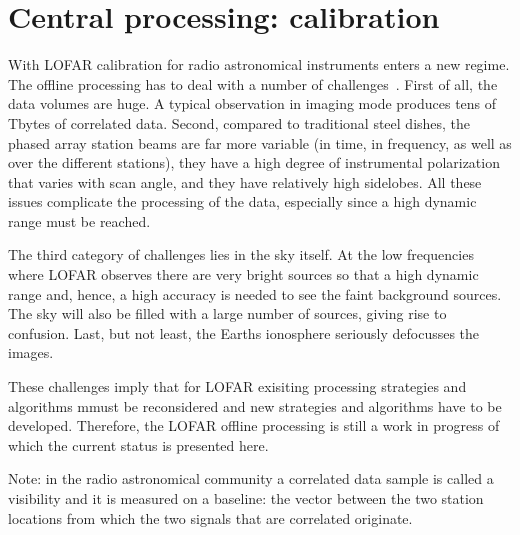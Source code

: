 \documentclass[journal]{IEEEtran}
\begin{document}

\section{Central processing: calibration}

With LOFAR calibration for radio astronomical instruments enters a new regime. The offline processing has to deal with a number of challenges~\cite{Noordam:04,Noordam:06,Nijboer:07}. First of all, the data volumes are huge. A typical observation in imaging mode produces tens of Tbytes of correlated data. Second, compared to traditional steel dishes, the phased array station beams are far more variable (in time, in frequency, as well as over the different stations), they have a high degree of instrumental polarization that varies with scan angle, and they have relatively high sidelobes. All these issues complicate the processing of the data, especially since a high dynamic range must be reached. 

The third category of challenges lies in the sky itself. At the low frequencies where LOFAR observes there are very bright sources so that a high dynamic range and, hence, a high accuracy is needed to see the faint background sources. The sky will also be filled with a large number of sources, giving rise to confusion. Last, but not least, the Earths ionosphere seriously defocusses the images.

These challenges imply that for LOFAR exisiting processing strategies and algorithms mmust be reconsidered and new strategies and algorithms have to be developed. Therefore, the LOFAR offline processing is still a work in progress of which the current status is presented here.

Note: in the radio astronomical community a correlated data sample is called a visibility and it is measured on a baseline: the vector between the two station locations from which the two signals that are correlated originate.
\label{sec:offline}
\end{document}
